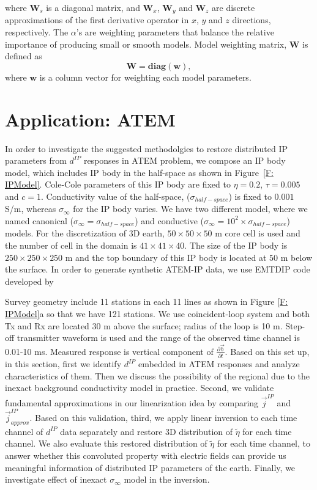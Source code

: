 \documentclass[a4paper, 11pt]{article}
\newcommand{\siginf}{\sigma_\infty}
\renewcommand {\j}  { {\vec j} }
\renewcommand {\b}  { {\vec b} }
\newcommand{\peta}{\tilde{\eta}}
\begin{document}
where $\mathbf{W}_s$ is a diagonal matrix, and $\mathbf{W}_x$, $\mathbf{W}_y$ and $\mathbf{W}_z$ are discrete approximations of the first derivative operator in $x$, $y$ and $z$ directions, respectively.  The $\alpha$'s are weighting parameters that balance the relative importance of producing small or smooth models. Model weighting matrix, $\mathbf{W}$ is defined as
\begin{equation}
    \mathbf{W} = \mathbf{diag}(\mathbf{w}),
    \label{eq: weight_mat}
\end{equation}
where $\mathbf{w}$ is a column vector for weighting each model parameters.
\section{Application: ATEM}

In order to investigate the suggested methodolgies to restore distributed IP parameters from $d^{IP}$ responses in ATEM problem, we compose an IP body model, which includes IP body in the half-space as shown in Figure~\ref{F: IPModel}. Cole-Cole parameters of this IP body are fixed to $\eta=0.2$, $\tau=0.005$ and $c=1$. Conductivity value of the half-space, ($\sigma_{half-space}$) is fixed to $0.001$ S/m, whereas $\siginf$ for the IP body varies. We have two different model, where we named canonical ($\siginf=\sigma_{half-space}$) and conductive ($\siginf=10^2\times\sigma_{half-space}$) models.   For the discretization of 3D earth, $50\times50\times50$ m core cell is used and the number of cell in the domain is $41\times41\times40$. The size of the IP body is $250\times250\times250$ m and the top boundary of this IP body is located at $50$ m below the surface. In order to generate synthetic ATEM-IP data, we use EMTDIP code developed by \cite{marchant2012a}

Survey geometry include 11 stations in each 11 lines as shown in Figure \ref{F: IPModel}a so that we have 121 stations. We use coincident-loop system and both Tx and Rx are located 30 m above the surface; radius of the loop is 10 m. Step-off transmitter waveform is used and the range of the observed time channel is 0.01-10 ms. Measured response is vertical component of $\frac{\partial\b}{\partial t}$. Based on this set up, in this section, first we identify $d^{IP}$ embedded in ATEM responses and analyze characteristics of them. Then we discuss the possibility of the regional due to the inexact background conductivity model in practice. Second, we validate fundamental approximations in our linearization idea by comparing $\j^{IP}$ and $\j^{IP}_{approx}$. Based on this validation, third, we apply linear inversion to each time channel of $d^{IP}$ data separately and restore 3D distribution of $\tilde{\eta}$ for each time channel. We also evaluate this restored distribution of $\peta$ for each time channel, to answer whether this convoluted property with electric fields can provide us meaningful information of distributed IP parameters of the earth. Finally, we investigate effect of inexact $\siginf$ model in the inversion.
\end{document}
